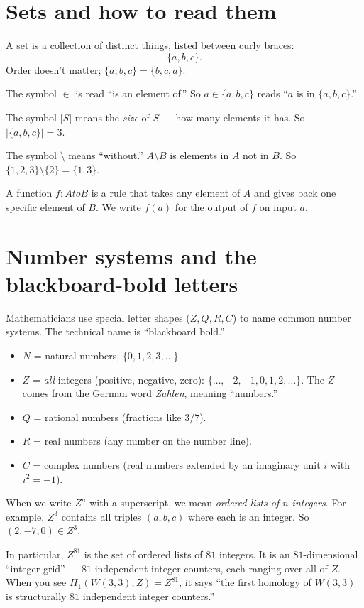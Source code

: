 \documentclass[11pt]{article}
\def\mathbb#1{#1}%
\def\textbf#1{#1}%
\def\to{ to }%
\newcommand{\W}{W(3,3)}
\begin{document}
\section{Sets and how to read them}

\begin{mathnote}
A \textbf{set} is a collection of distinct things, listed between curly braces:
\[
\{a, b, c\}.
\]
Order doesn't matter; $\{a, b, c\} = \{b, c, a\}$.

The symbol $\in$ is read ``is an element of.'' So $a \in \{a, b, c\}$ reads ``$a$ is in $\{a, b, c\}$.''

The symbol $|S|$ means the \emph{size} of $S$ --- how many elements it has. So $|\{a, b, c\}| = 3$.

The symbol $\setminus$ means ``without.'' $A \setminus B$ is elements in $A$ not in $B$. So $\{1,2,3\}\setminus\{2\} = \{1,3\}$.
\end{mathnote}

A \textbf{function} $f: A \to B$ is a rule that takes any element of $A$ and gives back one specific element of $B$. We write $f(a)$ for the output of $f$ on input $a$.

\section{Number systems and the blackboard-bold letters}

\begin{mathnote}
Mathematicians use special letter shapes ($\mathbb{Z}, \mathbb{Q}, \mathbb{R}, \mathbb{C}$) to name common number systems. The technical name is ``blackboard bold.''

\begin{itemize}[leftmargin=2em]
\item $\mathbb{N}$ = natural numbers, $\{0, 1, 2, 3, \ldots\}$.
\item $\mathbb{Z}$ = \emph{all} integers (positive, negative, zero): $\{\ldots, -2, -1, 0, 1, 2, \ldots\}$. The $\mathbb{Z}$ comes from the German word \emph{Zahlen}, meaning ``numbers.''
\item $\mathbb{Q}$ = rational numbers (fractions like $3/7$).
\item $\mathbb{R}$ = real numbers (any number on the number line).
\item $\mathbb{C}$ = complex numbers (real numbers extended by an imaginary unit $i$ with $i^2 = -1$).
\end{itemize}

When we write $\mathbb{Z}^n$ with a superscript, we mean \emph{ordered lists of $n$ integers}. For example, $\mathbb{Z}^3$ contains all triples $(a, b, c)$ where each is an integer. So $(2, -7, 0) \in \mathbb{Z}^3$.

In particular, $\mathbb{Z}^{81}$ is the set of ordered lists of $81$ integers. It is an $81$-dimensional ``integer grid'' --- $81$ independent integer counters, each ranging over all of $\mathbb{Z}$. When you see $H_1(\W; \mathbb{Z}) = \mathbb{Z}^{81}$, it says ``the first homology of $\W$ is structurally $81$ independent integer counters.''
\end{mathnote}
\end{document}
